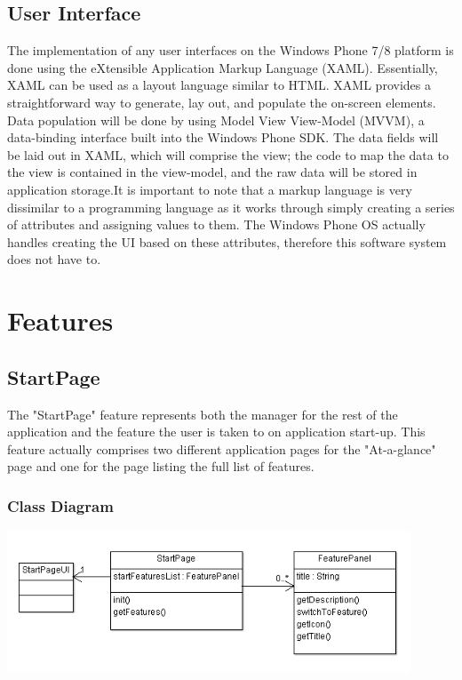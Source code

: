 \documentclass[pdftex,12pt,letter]{article}
\begin{document}
\subsection{User Interface}
The implementation of any user interfaces on the Windows Phone 7/8 platform is done using the eXtensible Application Markup Language (XAML). Essentially, XAML can be used as a layout language similar to HTML. XAML provides a straightforward way to generate, lay out, and populate the on-screen elements. Data population will be done by using Model View View-Model (MVVM), a data-binding interface built into the Windows Phone SDK. The data fields will be laid out in XAML, which will comprise the view; the code to map the data to the view is contained in the view-model, and the raw data will be stored in application storage.It is important to note that a markup language is very dissimilar to a programming language as it works through simply creating a series of attributes and assigning values to them. The Windows Phone OS actually handles creating the UI based on these attributes, therefore this software system does not have to. 
\\
\section{Features}
\subsection{StartPage}
The "StartPage" feature represents both the manager for the rest of the application and the feature the user is taken to on application start-up. This feature actually comprises two different application pages for the "At-a-glance" page and one for the page listing the full list of features.
\subsubsection{Class Diagram}
\includegraphics[width=120mm]{StartPageCD.png}
\end{document}
